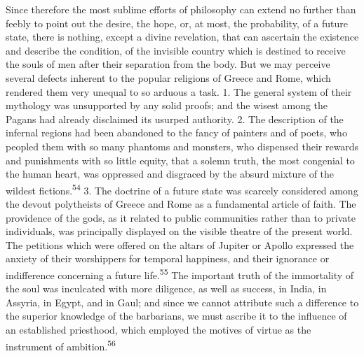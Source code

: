 


Since therefore the most sublime efforts of philosophy can extend
no further than feebly to point out the desire, the hope, or, at
most, the probability, of a future state, there is nothing,
except a divine revelation, that can ascertain the existence and
describe the condition, of the invisible country which is
destined to receive the souls of men after their separation from
the body. But we may perceive several defects inherent to the
popular religions of Greece and Rome, which rendered them very
unequal to so arduous a task. 1. The general system of their
mythology was unsupported by any solid proofs; and the wisest
among the Pagans had already disclaimed its usurped authority. 2.
The description of the infernal regions had been abandoned to the
fancy of painters and of poets, who peopled them with so many
phantoms and monsters, who dispensed their rewards and
punishments with so little equity, that a solemn truth, the most
congenial to the human heart, was oppressed and disgraced by the
absurd mixture of the wildest fictions.\textsuperscript{54} 3. The doctrine of a
future state was scarcely considered among the devout polytheists
of Greece and Rome as a fundamental article of faith. The
providence of the gods, as it related to public communities
rather than to private individuals, was principally displayed on
the visible theatre of the present world. The petitions which
were offered on the altars of Jupiter or Apollo expressed the
anxiety of their worshippers for temporal happiness, and their
ignorance or indifference concerning a future life.\textsuperscript{55} The
important truth of the immortality of the soul was inculcated
with more diligence, as well as success, in India, in Assyria, in
Egypt, and in Gaul; and since we cannot attribute such a
difference to the superior knowledge of the barbarians, we must
ascribe it to the influence of an established priesthood, which
employed the motives of virtue as the instrument of ambition.\textsuperscript{56}

